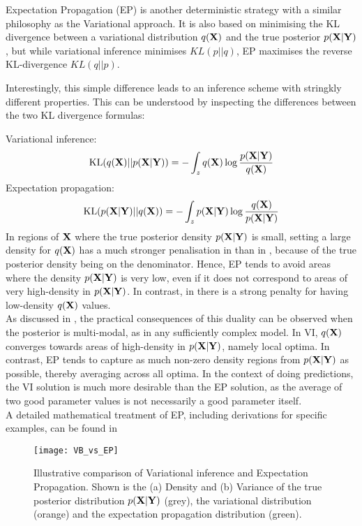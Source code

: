 Expectation Propagation (EP) is another deterministic strategy with a similar philosophy as the Variational approach. It is also based on minimising the KL divergence between a variational distribution $q({\bf X})$ and the true posterior $p({\bf X}|{\bf Y})$, but while variational inference minimises $KL(p||q)$, EP maximises the reverse KL-divergence $KL(q||p)$.

Interestingly, this simple difference leads to an inference scheme with stringkly different properties. This can be understood by inspecting the differences between the two KL divergence formulas:

Variational inference:
\begin{equation} \label{eq:kl_vb}
	{\rm KL}(q({\bf X})||p({\bf X}|{\bf Y})) = - \int_z q({\bf X}) \log \frac{p({\bf X}|{\bf Y})}{q({\bf X})}
\end{equation}
Expectation propagation:
\begin{equation} \label{eq:kl_ep}
	{\rm KL}(p({\bf X}|{\bf Y})||q({\bf X})) = - \int_z p({\bf X}|{\bf Y}) \log \frac{q({\bf X})}{p({\bf X}|{\bf Y})}
\end{equation}
In regions of ${\bf X}$ where the true posterior density $p({\bf X}|{\bf Y})$ is small, setting a large density for $q({\bf X})$ has a much stronger penalisation in  than in , because of the true posterior density being on the denominator. Hence, EP tends to avoid areas where the density $p({\bf X}|{\bf Y})$ is very low, even if it does not correspond to areas of very high-density in $p({\bf X}|{\bf Y})$. In contrast, in  there is a strong penalty for having low-density $q({\bf X})$ values.\\
As discussed in \cite{Bishop2006}, the practical consequences of this duality can be observed when the posterior is multi-modal, as in any sufficiently complex model. In VI, $q({\bf X})$ converges towards areas of high-density in $p({\bf X}|{\bf Y})$, namely local optima. In contrast, EP tends to capture as much non-zero density regions from $p({\bf X}|{\bf Y})$ as possible, thereby averaging across all optima. In the context of doing predictions, the VI solution is much more desirable than the EP solution, as the average of two good parameter values is not necessarily a good parameter itself.\\
A detailed mathematical treatment of EP, including derivations for specific examples, can be found in \cite{Bishop2006,Murphy,Minka2001}

\begin{figure}[H]
	\centering
	\texttt{[image: VB\_vs\_EP]}
	\caption{Illustrative comparison of Variational inference and Expectation Propagation. Shown is the (a) Density and (b) Variance of the true posterior distribution $p({\bf X}|{\bf Y})$ (grey), the variational distribution (orange) and the expectation propagation distribution (green).}
	\label{}
\end{figure}

